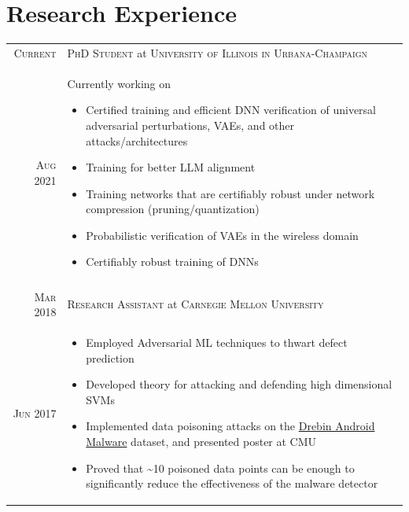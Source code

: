 \documentclass[a4paper,10pt]{article}
\begin{document}
\section{Research Experience}
\begin{tabular}{r|p{11cm}}
 \textsc{Current} & \textsc{PhD Student} at \textsc{University of Illinois in Urbana-Champaign}\\
 \textsc{Aug 2021} & \small{Currently working on 
 \begin{itemize}
     \item  Certified training and efficient DNN verification of universal adversarial perturbations, VAEs, and other attacks/architectures
     \item Training for better LLM alignment
     \item Training networks that are certifiably robust under network compression (pruning/quantization)
     \item Probabilistic verification of VAEs in the wireless domain
     \item Certifiably robust training of DNNs
 \end{itemize}\vspace{-15pt}}\\\multicolumn{2}{c}{} \\
 \textsc{Mar 2018} & \textsc{Research Assistant} at \textsc{Carnegie Mellon University}\\
 \textsc{Jun 2017} & \small{\vspace{-10pt}\begin{itemize}
     \item Employed Adversarial ML techniques to thwart defect prediction
     \item Developed theory for attacking and defending high dimensional SVMs
     \item Implemented data poisoning attacks on the \href{https://www.sec.cs.tu-bs.de/~danarp/drebin/}{Drebin Android Malware} dataset, and presented poster at CMU
     \item Proved that \textasciitilde 10 poisoned data points can be enough to significantly reduce the effectiveness of the malware detector

\end{itemize}}
\end{tabular}
\end{document}
